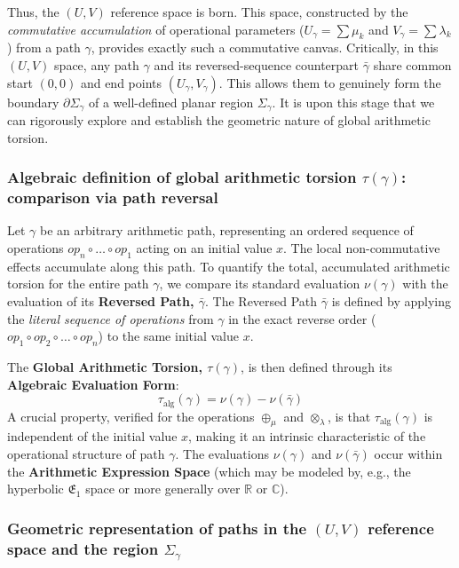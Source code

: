 Thus, the $(U,V)$ reference space is born. This space, constructed by the \textit{commutative accumulation} of operational parameters ($U_\gamma = \sum \mu_k$ and $V_\gamma = \sum \lambda_k$) from a path $\gamma$, provides exactly such a commutative canvas. Critically, in this $(U,V)$ space, any path $\gamma$ and its reversed-sequence counterpart $\bar{\gamma}$ share common start $(0,0)$ and end points $(U_\gamma, V_\gamma)$. This allows them to genuinely form the boundary $\partial\Sigma_\gamma$ of a well-defined planar region $\Sigma_\gamma$. It is upon this stage that we can rigorously explore and establish the geometric nature of global arithmetic torsion.

\subsubsection*{Algebraic definition of global arithmetic torsion $\tau(\gamma)$: comparison via path reversal}

Let $\gamma$ be an arbitrary arithmetic path, representing an ordered sequence of operations $op_n \circ \dots \circ op_1$ acting on an initial value $x$. The local non-commutative effects accumulate along this path. To quantify the total, accumulated arithmetic torsion for the entire path $\gamma$, we compare its standard evaluation $\nu(\gamma)$ with the evaluation of its \textbf{Reversed Path, $\bar{\gamma}$}. The Reversed Path $\bar{\gamma}$ is defined by applying the \textit{literal sequence of operations} from $\gamma$ in the exact reverse order ($op_1 \circ op_2 \circ \dots \circ op_n$) to the same initial value $x$.

The \textbf{Global Arithmetic Torsion, $\tau(\gamma)$}, is then defined through its \textbf{Algebraic Evaluation Form}:
\begin{equation}
\tau_{\text{alg}}(\gamma) = \nu(\gamma) - \nu(\bar{\gamma})
\label{eq:T_alg_formal_final_narrative_enhanced}
\end{equation}
A crucial property, verified for the operations $\oplus_\mu$ and $\otimes_\lambda$, is that $\tau_{\text{alg}}(\gamma)$ is independent of the initial value $x$, making it an intrinsic characteristic of the operational structure of path $\gamma$. The evaluations $\nu(\gamma)$ and $\nu(\bar{\gamma})$ occur within the \textbf{Arithmetic Expression Space} (which may be modeled by, e.g., the hyperbolic $\mathfrak{E}_1$ space or more generally over $\mathbb{R}$ or $\mathbb{C}$).

\subsubsection*{Geometric representation of paths in the $(U,V)$ reference space and the region $\Sigma_\gamma$}


